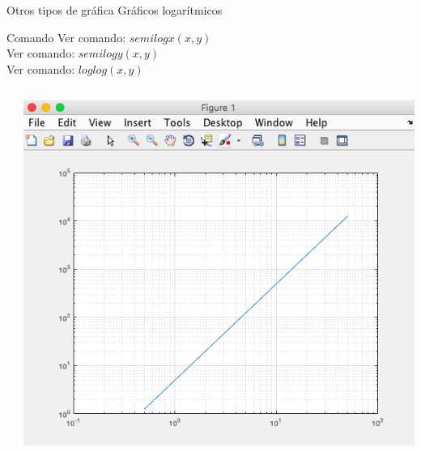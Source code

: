\documentclass{bredelebeamer}
\begin{document}
\begin{frame}{Otros tipos de gráfica}
Gráficos logarítmicos
\begin{exampleblock}{Comando}
Ver comando: \textbf{$semilogx(x,y)$}\\
Ver comando: \textbf{$semilogy(x,y)$}\\
Ver comando: \textbf{$loglog(x,y)$}
\end{exampleblock}
\begin{columns}
\begin{column}{0.5\textwidth}

\end{column}
\begin{column}{0.5\textwidth}
\begin{center}
\includegraphics[scale=0.2]{images/pantalla23.png}
\end{center}
\end{column}
\end{columns}
\end{frame}
\end{document}
